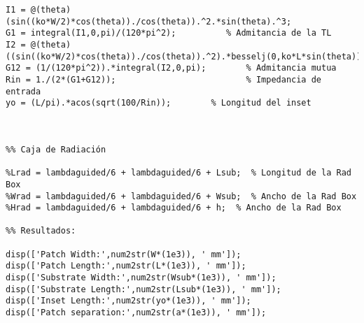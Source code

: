 \begin{lstlisting}[style=Matlab-color, caption={\textit{AntennaPatchCalculator.m}},label=codigofull]
I1 = @(theta) (sin((ko*W/2)*cos(theta))./cos(theta)).^2.*sin(theta).^3;
G1 = integral(I1,0,pi)/(120*pi^2);          % Admitancia de la TL
I2 = @(theta) ((sin((ko*W/2)*cos(theta))./cos(theta)).^2).*besselj(0,ko*L*sin(theta)).*sin(theta).^3;
G12 = (1/(120*pi^2)).*integral(I2,0,pi);        % Admitancia mutua
Rin = 1./(2*(G1+G12));                          % Impedancia de entrada
yo = (L/pi).*acos(sqrt(100/Rin));        % Longitud del inset



%% Caja de Radiación

%Lrad = lambdaguided/6 + lambdaguided/6 + Lsub;  % Longitud de la Rad Box
%Wrad = lambdaguided/6 + lambdaguided/6 + Wsub;  % Ancho de la Rad Box
%Hrad = lambdaguided/6 + lambdaguided/6 + h;  % Ancho de la Rad Box

%% Resultados:

disp(['Patch Width:',num2str(W*(1e3)), ' mm']);
disp(['Patch Length:',num2str(L*(1e3)), ' mm']);
disp(['Substrate Width:',num2str(Wsub*(1e3)), ' mm']);
disp(['Substrate Length:',num2str(Lsub*(1e3)), ' mm']);
disp(['Inset Length:',num2str(yo*(1e3)), ' mm']);
disp(['Patch separation:',num2str(a*(1e3)), ' mm']);


\end{lstlisting}